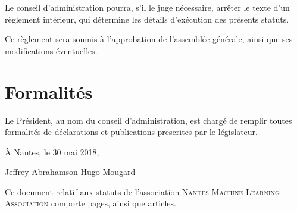 \documentclass[12 pt]{article}
\newcommand{\Nom}{\textsc{Nantes Machine Learning Association}}
\begin{document}
Le conseil d'administration pourra, s'il le juge nécessaire, arrêter
le texte d'un règlement intérieur, qui détermine les détails
d'exécution des présents statuts.

Ce règlement sera soumis à l'approbation de l'assemblée générale,
ainsi que ses modifications éventuelles.

\section{Formalités}
\label{sec:formalites}

Le Président, au nom du conseil d'administration, est chargé de remplir toutes formalités de déclarations et publications prescrites par le législateur.

\vfill{}

\begin{flushright}
  À Nantes, le 30 mai 2018,
\end{flushright}

\vspace{10mm}

\hfill{} Jeffrey Abrahamson \hspace{4cm} Hugo Mougard \hfill{}

\vspace{15mm}

Ce document relatif aux statuts de l'association \Nom{} comporte
\pageref{LastPage} pages, ainsi que  articles.

\vfill{}

\end{document}
